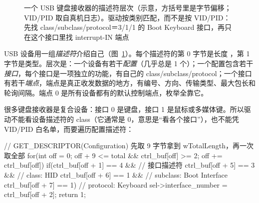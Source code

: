 \begin{figure}[htbp]
  \caption{一个 USB 键盘接收器的描述符层次（示意，方括号里是字节偏移；VID/PID 取自真机日志）。驱动按类别匹配，而不是按 VID/PID：先找 class/subclass/protocol＝3/1/1 的 Boot Keyboard 接口，再只在这个接口里找 interrupt-IN 端点}
  \label{fig:usb-desc}
\end{figure}

USB 设备用一组\emph{描述符}介绍自己（图~\ref{fig:usb-desc}）。每个描述符的第 0 字节是长度 ，第 1 字节是类型。层次是：一个设备有若干\emph{配置}（几乎总是 1 个）；一个配置包含若干\emph{接口}，每个接口是一项独立的功能，有自己的 class/subclass/protocol；一个接口有若干\emph{端点}，端点是真正收发数据的地方，有编号、方向、传输类型、最大包长和轮询间隔。端点 0 是所有设备都有的默认控制端点，枚举全靠它。

很多键盘接收器是复合设备：接口 0 是键盘，接口 1 是鼠标或多媒体键。所以驱动不能看设备描述符的 class（它通常是 0，意思是“看各个接口”），也不能凭 VID/PID 白名单，而要遍历配置描述符：

\begin{ccode}
// GET_DESCRIPTOR(Configuration) 先取 9 字节拿到 wTotalLength，再一次取全部
for(int off = 0; off + 9 <= total && ctrl_buf[off] >= 2; off += ctrl_buf[off]){
  if(ctrl_buf[off + 1] == 4 &&                   // 接口描述符
     ctrl_buf[off + 5] == 3 &&                   // class: HID
     ctrl_buf[off + 6] == 1 &&                   // subclass: Boot Interface
     ctrl_buf[off + 7] == 1){                    // protocol: Keyboard
    sel->interface_number = ctrl_buf[off + 2];
    return 1;
  }
}
\end{ccode}

